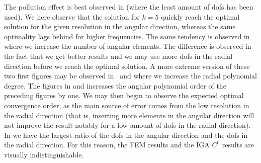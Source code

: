 The pollution effect is best observed in  (where the least amount of dofs has been used). We here observe that the solution for $k=5$ quickly reach the optimal solution for the given resolution in the angular direction, whereas the same optimality lags behind for higher frequencies. The same tendency is observed in~ where we increase the number of angular elements. The difference is observed in the fact that we get better results and we may use more dofs in the radial direction before we reach the optimal solution. A more extreme version of these two first figures may be observed in~ and  where we increase the radial polynomial degree. The figures in  and  increases the angular polynomial order of the preceding figures by one. We may then begin to observe the expected optimal convergence order, as the main source of error comes from the low resolution in the radial direction (that is, inserting more elements in the angular direction will not improve the result notably for a low amount of dofs in the radial direction). In  we have the largest ratio of the dofs in the angular direction and the dofs in the radial direction. For this reason, the FEM results and the IGA $C^0$ results are visually indistinguishable.

